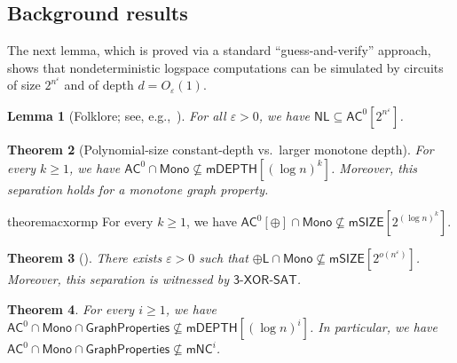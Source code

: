\documentclass[10pt,a4paper]{article}
\newtheorem{theorem}{Theorem}[section]
\newtheorem{lemma}[theorem]{Lemma}
\newcommand{\eps}{\varepsilon}
\newcommand{\complexityfont}[1]{\mathsf{#1}}
\newcommand{\monclass}[1]{\mathsf{m}#1}
\def\mNC          {\monclass{\NC}}
\newcommand\NL           {\complexityfont{NL}}
\def\AC           {\complexityfont{AC}}
\def\pL           {\oplus\complexityfont{L}}
\def\NC           {\complexityfont{NC}}
\def\SIZE         {\complexityfont{SIZE}}
\def\DEPTH        {\complexityfont{DEPTH}}
\def\mSIZE        {\monclass{\SIZE}}
\def\mDEPTH       {\monclass{\DEPTH}}
\newcommand{\semMon}[1]{#1 \cap \monfns}
\newcommand{\monfns}{\mathsf{Mono}}
\newcommand{\GraphPpts}{\mathsf{GraphProperties}}
\newcommand{\txorsat}{\mathsf{3\mbox{-}XOR\mbox{-}SAT}}
\def\sseq{\subseteq}
\begin{document}
\subsection{Background results}


The next lemma, which is proved via a standard ``guess-and-verify''
approach, shows that nondeterministic logspace computations can be
simulated by circuits of size $2^{n^{\varepsilon}}$ and of depth $d =
O_\varepsilon(1)$.

\begin{lemma}[Folklore; see, e.g.,~{\cite[Lemma 8.1]{AHMPS08}}]
    \label{lemma:ac0_nc1_sim}
    For all $\eps > 0$, we have
    $\NL \sseq \AC^0[2^{n^\eps}]$.
\end{lemma}







\begin{theorem}[Polynomial-size constant-depth vs.~larger monotone depth]
    \label{thm:ac0-fml-graph-intro}
    For every $k \geq 1$,
    we have
    $\semMon{\AC^0} \not\sseq \mDEPTH[(\log n)^k]$. Moreover, this separation holds for a monotone graph property.
\end{theorem}

\begin{restatable}{theorem}{acxormp}
    \label{thm:ac02-mp-intro}
    For every $k \geq 1$,
    we have
$\semMon{\AC^0[\oplus]} \not\sseq \mSIZE[2^{(\log n)^k}]$.
\end{restatable}

\begin{theorem}[\cite{gkrs19}]
    \label{thm:xor-sat}
    There exists $\eps > 0$ 
    such that 
    $\semMon{\pL} \not\sseq \mSIZE[2^{o(n^{\eps})}]$.
    Moreover, 
    this separation is witnessed by $\txorsat$.
\end{theorem}

\begin{theorem}
    \label{thm:ac0-fml-graph}
    For every $i \geq 1$,
    we have
    $\semMon{\AC^0} \cap \GraphPpts \not\sseq \mDEPTH[(\log n)^i]$.
    In particular, we have
    $\semMon{\AC^0} \cap \GraphPpts \not\sseq \mNC^i$.
\end{theorem}
\end{document}

